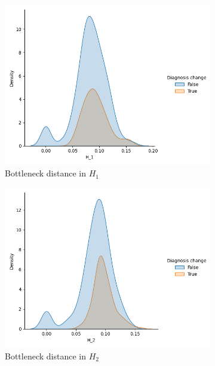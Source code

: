 \documentclass{article}
\begin{document}
\begin{figure}
\begin{subfigure}{0.32\textwidth}
    \includegraphics[width=\textwidth]{figures/temporal_evolution/bottleneck_H_1_dist_diag_change.png}
    \caption{Bottleneck distance in $H_1$}
  \end{subfigure}
  \begin{subfigure}{0.32\textwidth}
    \includegraphics[width=\textwidth]{figures/temporal_evolution/bottleneck_H_2_dist_diag_change.png}
    \caption{Bottleneck distance in $H_2$}
  \end{subfigure}
  \begin{subfigure}{0.32\textwidth}

\end{subfigure}
\end{figure}
\end{document}
